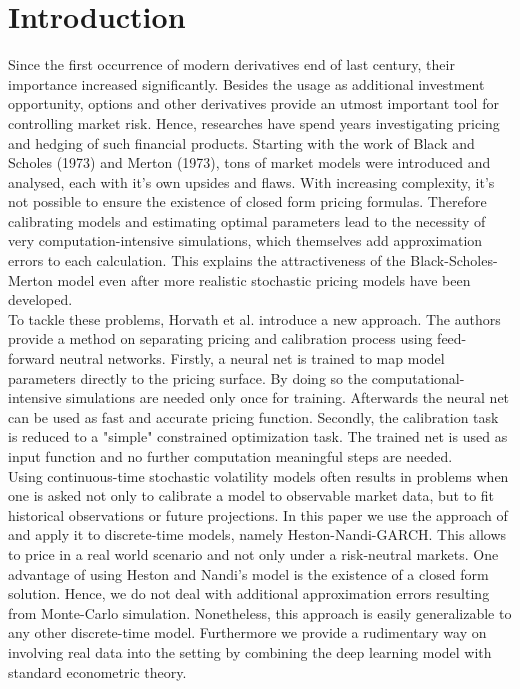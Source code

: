 \documentclass{article}
\begin{document}
\section{Introduction}
Since the first occurrence of modern derivatives end of last century, their importance increased significantly. Besides the usage as additional investment opportunity, options and other derivatives provide an utmost important tool for controlling market risk. Hence, researches have spend years investigating pricing and hedging of such financial products. Starting with the work of Black and Scholes (1973) and Merton (1973), tons of market models were introduced and analysed, each with it's own upsides and flaws. With increasing complexity, it's not possible to ensure the existence of closed form pricing formulas. Therefore calibrating models and estimating optimal parameters lead to the necessity of very computation-intensive simulations, which themselves add approximation errors to each calculation. This explains the attractiveness of the Black-Scholes-Merton model even after more realistic stochastic pricing models have been developed.  \\ 
To tackle these problems, Horvath et al.  \cite{Blanka} introduce a new approach. The authors provide a method on separating pricing and calibration process using feed-forward neutral networks. Firstly, a neural net is trained to map model parameters directly to the pricing surface. By doing so the computational-intensive simulations are needed  only once for training. Afterwards the neural net  can be used as fast and accurate pricing function. Secondly, the calibration task is reduced to a "simple" constrained optimization task. The trained net is used as input function and no further computation meaningful steps are needed. \\
Using continuous-time stochastic volatility models often results in problems when one is asked not only to calibrate a model to observable market data, but to fit historical observations or future projections. In this paper we use the approach of \cite{Blanka} and apply it to discrete-time models, namely Heston-Nandi-GARCH. This allows to price in a real world scenario and not only under a risk-neutral markets. One advantage of using Heston and Nandi's model is the existence of a closed form solution. Hence, we do not deal with additional approximation errors resulting from Monte-Carlo simulation. Nonetheless, this approach is easily generalizable to any other discrete-time model. Furthermore we provide a rudimentary way on involving real data into the setting by combining the deep learning model with standard econometric theory.
\end{document}
